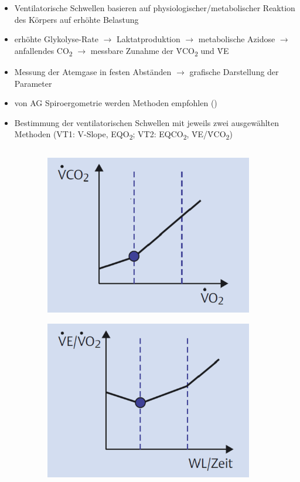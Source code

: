 \documentclass[colorBG,slideColor,8pt]{beamer}
\newcommand{\eqotwo}{EQO\textsubscript{2}}
\newcommand{\eqcotwo}{EQCO\textsubscript{2}}
\newcommand{\vcotwo}{\.{V}CO\textsubscript{2}}
\newcommand{\ve}{\.{V}E}
\begin{document}
\begin{frame}
\begin{itemize}
	\item Ventilatorische Schwellen basieren auf physiologischer/metabolischer Reaktion des Körpers auf erhöhte Belastung
	\item erhöhte Glykolyse-Rate $\rightarrow$ Laktatproduktion $\rightarrow$ metabolische Azidose $\rightarrow$ anfallendes CO\textsubscript{2} $\rightarrow$ messbare Zunahme der \vcotwo{} und \ve
	\item Messung der Atemgase in festen Abständen $\rightarrow$ grafische Darstellung der Parameter
	\item von AG Spiroergometrie werden Methoden empfohlen (\cite{Westhoff.2012})
	\item Bestimmung der ventilatorischen Schwellen mit jeweils zwei ausgewählten Methoden (VT1: V-Slope, \eqotwo; VT2: \eqcotwo, \ve/\vcotwo)
\end{itemize}
\begin{columns}
\begin{column}{\linewidth}
\begin{figure}[H]
	\begin{subfigure}[c]{0.2\linewidth}
		\centering
		\includegraphics[width=0.8\linewidth]{Bilder/vslope.png}
	\end{subfigure}
	\begin{subfigure}[c]{0.2\linewidth}
		\centering
		\includegraphics[width=0.8\linewidth]{Bilder/eqo2.png}

\end{subfigure}
\end{figure}
\end{column}
\end{columns}
\end{frame}
\end{document}
